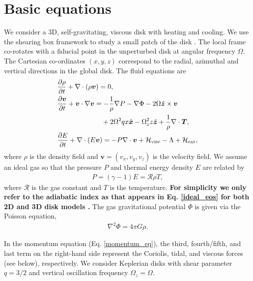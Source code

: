 \section{Basic equations}\label{basic}
We consider a 3D, self-gravitating,
viscous disk with heating and cooling. We use the shearing box framework to
study a small patch of the disk \citep{goldreich65}. The local frame
co-rotates with a fiducial point in the unperturbed disk at angular
frequency $\Omega$. The Cartesian co-ordinates $(x,y,z)$ correspond
to the radial, azimuthal and vertical directions in the global disk. 
The fluid equations are
\begin{align}
  &\frac{\p\rho}{\p t} + \nabla\cdot\left(\rho\bm{v}\right) = 0, \\
  & \frac{\p\bm{v}}{\p t} + \bm{v}\cdot\nabla\bm{v} =
  -\frac{1}{\rho}\nabla P - \nabla\Phi - 2\Omega\hat{\bm{z}}\times\bm{v}\notag\\ & 
  \phantom{\frac{\p\bm{v}}{\p t} + \bm{v}\cdot\nabla\bm{v} =}
  +2\Omega^2qx\hat{\bm{x}} -\Omega_z^2z\hat{\bm{z}} 
   + \frac{1}{\rho}\nabla\cdot\bm{T},\label{momentum_eq}\\
  & \frac{\p E}{\p t} + \nabla\cdot\left(E\bm{v}\right) = - P
  \nabla\cdot\bm{v} + \mathcal{H}_\mathrm{visc} - \Lambda +
  \mathcal{H}_\mathrm{ext} ,\label{energy_eq}
\end{align} 
where $\rho$ is the density field and $\bm{v} = (v_x, v_y, v_z)$ is
the velocity field. 
We assume an ideal gas so that the pressure $P$ and thermal energy
density $E$ are related by  
\begin{align}\label{ideal_eos}
  P = (\gamma-1)E = \mathcal{R}\rho T, 
\end{align}
where $\mathcal{R}$ is the gas constant and $T$ is the temperature. 
{\bf For simplicity we only refer to the adiabatic index as that
  appears in Eq. \ref{ideal_eos} for both 2D and 3D disk models 
  \citep[cf.][]{johnson03}.  %
}
The gas 
gravitational potential $\Phi$ is given via the Poisson equation,  
\begin{align}
 \nabla^2\Phi = 4 \pi G \rho. 
\end{align}


In the momentum equation (Eq. \ref{momentum_eq}), the third,
fourth/fifth, and last term on the right-hand side represent the Coriolis, 
tidal, and viscous forces (see below), respectively. We consider    
Keplerian disks with shear parameter $q=3/2$ and vertical oscillation 
frequency $\Omega_z=\Omega$.  

